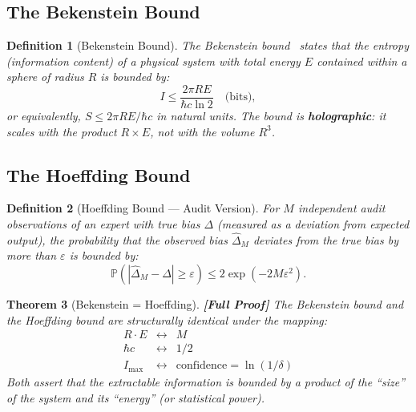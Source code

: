 \documentclass[12pt,a4paper]{article}
\newtheorem{theorem}{Theorem}[section]
\newtheorem{definition}[theorem]{Definition}
\theoremstyle{remark}
\newcommand{\Pbb}{\mathbb{P}}
\newcommand{\rigorFull}{\textbf{[Full Proof]}}
\begin{document}
\subsection{The Bekenstein Bound}

\begin{definition}[Bekenstein Bound]
\label{def:bekenstein_bound}
The Bekenstein bound~\cite{bekenstein1981universal} states that the entropy (information content) of a physical system with total energy $E$ contained within a sphere of radius $R$ is bounded by:
\begin{equation}
  \label{eq:bekenstein_bound}
  I \leq \frac{2\pi R E}{\hbar c \ln 2} \quad \text{(bits)},
\end{equation}
or equivalently, $S \leq 2\pi R E / \hbar c$ in natural units. The bound is \textbf{holographic}: it scales with the product $R \times E$, not with the volume $R^3$.
\end{definition}

\subsection{The Hoeffding Bound}

\begin{definition}[Hoeffding Bound — Audit Version]
\label{def:hoeffding_bound}
For $M$ independent audit observations of an expert with true bias $\Delta$ (measured as a deviation from expected output), the probability that the observed bias $\hat{\Delta}_M$ deviates from the true bias by more than $\varepsilon$ is bounded by:
\begin{equation}
  \label{eq:hoeffding}
  \Pbb(|\hat{\Delta}_M - \Delta| \geq \varepsilon) \leq 2\exp(-2M\varepsilon^2).
\end{equation}
\end{definition}

\begin{theorem}[Bekenstein = Hoeffding]
\label{thm:bekenstein_hoeffding}
\rigorFull
The Bekenstein bound and the Hoeffding bound are structurally identical under the mapping:
\begin{equation}
  \begin{array}{ccc}
    R \cdot E & \longleftrightarrow & M \\[4pt]
    \hbar c & \longleftrightarrow & 1/2 \\[4pt]
    I_{\max} & \longleftrightarrow & \text{confidence} = \ln(1/\delta)
  \end{array}
\end{equation}
Both assert that the extractable information is bounded by a product of the ``size'' of the system and its ``energy'' (or statistical power).
\end{theorem}
\end{document}
